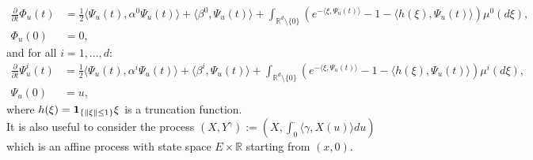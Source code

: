 \documentclass[12pt,a4paper]{article}
\theoremstyle{plain}
\numberwithin{equation}{section}
\begin{document}
\begin{align*}
\frac{\partial}{\partial t} \Phi_u(t) & = \frac{1}{2}\langle \Psi_u(t),\alpha^0\Psi_u(t) \rangle+\langle \beta^0,\Psi_u(t) \rangle+\int_{\mathbb{R}^d\setminus \{ 0\}}
\left(e^{- \langle\xi, \Psi_u(t)\rangle}-1-\langle h(\xi),\Psi_u(t) \rangle\right)\mu^0(d\xi),\\
\Phi_u(0) & = 0,
\end{align*}
and for all $i=1,...,d:$
\begin{align*}
\frac{\partial}{\partial t} \Psi^i_u(t)&  = \frac{1}{2}\langle\Psi_u(t) ,\alpha^i \Psi_u(t) \rangle+\langle\beta^i,\Psi_u(t) \rangle+
\int_{\mathbb{R}^d\setminus \{ 0\}}\left(e^{- \langle\xi, \Psi_u(t)\rangle}-1-\langle h(\xi),\Psi_u(t) \rangle\right)\mu^i (d\xi),\\
\Psi_u(0) & = u,
\end{align*}
where $h(\xi)={\bf 1}_{\{\parallel \xi\parallel \leq 1\} }\xi$ is a truncation function.\\





It is also useful to consider the process
$ (X,Y^{\gamma}) := (X,\int_0^{\cdot} \langle\gamma ,X(u)\rangle du)$ which is an affine process with state space
$E \times \mathbb{R}$ starting from $(x,0)$.
\end{document}

